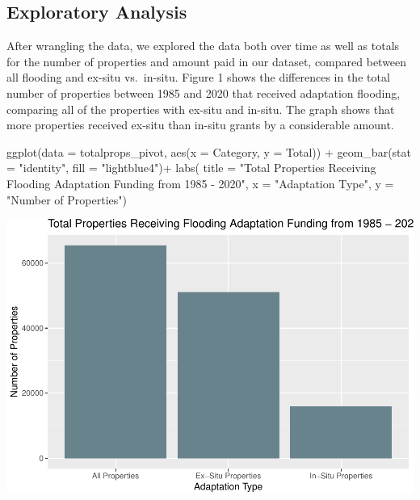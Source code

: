\documentclass[
  12pt,
]{article}
\newenvironment{Shaded}{\begin{snugshade}}{\end{snugshade}}
\newcommand{\AttributeTok}[1]{\textcolor[rgb]{0.77,0.63,0.00}{#1}}
\newcommand{\FunctionTok}[1]{\textcolor[rgb]{0.00,0.00,0.00}{#1}}
\newcommand{\NormalTok}[1]{#1}
\newcommand{\SpecialCharTok}[1]{\textcolor[rgb]{0.00,0.00,0.00}{#1}}
\newcommand{\StringTok}[1]{\textcolor[rgb]{0.31,0.60,0.02}{#1}}
\begin{document}
\newpage

\hypertarget{exploratory-analysis}{%
\subsection{Exploratory Analysis}\label{exploratory-analysis}}

After wrangling the data, we explored the data both over time as well as
totals for the number of properties and amount paid in our dataset,
compared between all flooding and ex-situ vs.~in-situ. Figure 1 shows
the differences in the total number of properties between 1985 and 2020
that received adaptation flooding, comparing all of the properties with
ex-situ and in-situ. The graph shows that more properties received
ex-situ than in-situ grants by a considerable amount.

\begin{Shaded}
\begin{Highlighting}[]
\FunctionTok{ggplot}\NormalTok{(}\AttributeTok{data =}\NormalTok{ totalprops\_pivot, }\FunctionTok{aes}\NormalTok{(}\AttributeTok{x =}\NormalTok{ Category, }\AttributeTok{y =}\NormalTok{ Total)) }\SpecialCharTok{+}
  \FunctionTok{geom\_bar}\NormalTok{(}\AttributeTok{stat =} \StringTok{"identity"}\NormalTok{, }\AttributeTok{fill =} \StringTok{"lightblue4"}\NormalTok{)}\SpecialCharTok{+}
  \FunctionTok{labs}\NormalTok{( }
    \AttributeTok{title =} \StringTok{"Total Properties Receiving Flooding Adaptation Funding from 1985 {-} 2020"}\NormalTok{, }
    \AttributeTok{x =} \StringTok{"Adaptation Type"}\NormalTok{, }
    \AttributeTok{y =} \StringTok{"Number of Properties"}\NormalTok{)}
\end{Highlighting}
\end{Shaded}

\includegraphics{finalreport_files/figure-latex/unnamed-chunk-1-1.pdf}
\end{document}
